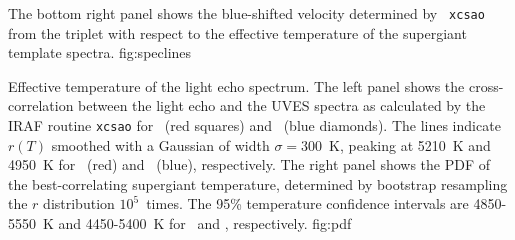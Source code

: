 {%
  The bottom right panel shows the blue-shifted velocity determined by {\tt
  xcsao} from the  triplet with respect to the effective temperature\cite{Humphreys84}
  of the supergiant template spectra. 
}
{fig:speclines}

{Effective temperature of the light echo spectrum.  The left panel
shows the cross-correlation between the light echo and the UVES
spectra as calculated by the IRAF routine {\tt xcsao} for \specMlo\
(red squares) and \specDP\ (blue diamonds).  The lines indicate $r(T)$
smoothed with a Gaussian of width $\sigma=300$~K, peaking at 5210~K
and 4950~K for \specMlo\ (red) and \specDP\ (blue), respectively. The
right panel shows the PDF of the best-correlating supergiant
temperature, determined by bootstrap resampling the $r$ distribution
$10^5$~times. The 95\% temperature confidence intervals are
4850-5550~K and 4450-5400~K for \specMlo\ and \specDP, respectively.}
{fig:pdf}

